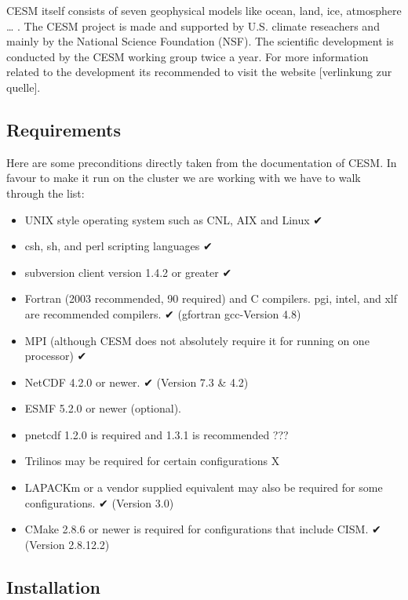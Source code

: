 \documentclass[]{article}
\providecommand{\tightlist}{%
  \setlength{\itemsep}{0pt}\setlength{\parskip}{0pt}}
\begin{document}
CESM itself consists of seven geophysical models like ocean, land, ice,
atmosphere \ldots{} . The CESM project is made and supported by U.S.
climate reseachers and mainly by the National Science Foundation (NSF).
The scientific development is conducted by the CESM working group twice
a year. For more information related to the development its recommended
to visit the website {[}verlinkung zur quelle{]}.

\subsection{Requirements}\label{requirements}

Here are some preconditions directly taken from the documentation of
CESM. In favour to make it run on the cluster we are working with we
have to walk through the list:

\begin{itemize}
\tightlist
\item
  UNIX style operating system such as CNL, AIX and Linux ✔
\item
  csh, sh, and perl scripting languages ✔
\item
  subversion client version 1.4.2 or greater ✔
\item
  Fortran (2003 recommended, 90 required) and C compilers. pgi, intel,
  and xlf are recommended compilers. ✔ (gfortran gcc-Version 4.8)
\item
  MPI (although CESM does not absolutely require it for running on one
  processor) ✔
\item
  NetCDF 4.2.0 or newer. ✔ (Version 7.3 \& 4.2)
\item
  ESMF 5.2.0 or newer (optional).
\item
  pnetcdf 1.2.0 is required and 1.3.1 is recommended ???
\item
  Trilinos may be required for certain configurations X
\item
  LAPACKm or a vendor supplied equivalent may also be required for some
  configurations. ✔ (Version 3.0)
\item
  CMake 2.8.6 or newer is required for configurations that include CISM.
  ✔ (Version 2.8.12.2)
\end{itemize}

\subsection{Installation}\label{installation-1}
\end{document}
